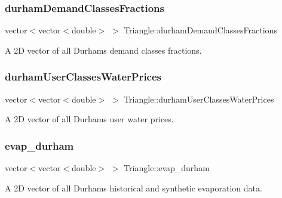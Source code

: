 \subsubsection{\texorpdfstring{durham\+Demand\+Classes\+Fractions}{durhamDemandClassesFractions}}
{\footnotesize\ttfamily vector$<$vector$<$double$>$ $>$ Triangle\+::durham\+Demand\+Classes\+Fractions\hspace{0.3cm}{\ttfamily [private]}}



A 2D vector of all Durham\textquotesingle{}s demand classes fractions. 

\mbox{\label{classTriangle_ab1b016ce397014e287ae5a213b04643d}} 
\subsubsection{\texorpdfstring{durham\+User\+Classes\+Water\+Prices}{durhamUserClassesWaterPrices}}
{\footnotesize\ttfamily vector$<$vector$<$double$>$ $>$ Triangle\+::durham\+User\+Classes\+Water\+Prices\hspace{0.3cm}{\ttfamily [private]}}



A 2D vector of all Durham\textquotesingle{}s user water prices. 

\mbox{\label{classTriangle_a11dd71d21edee3cf466d30117e378fb9}} 
\subsubsection{\texorpdfstring{evap\+\_\+durham}{evap\_durham}}
{\footnotesize\ttfamily vector$<$vector$<$double$>$ $>$ Triangle\+::evap\+\_\+durham\hspace{0.3cm}{\ttfamily [private]}}



A 2D vector of all Durham\textquotesingle{}s historical and synthetic evaporation data. 

\mbox{\label{classTriangle_a4ad865bba9e2b65233aa453ea95d1950}} 
